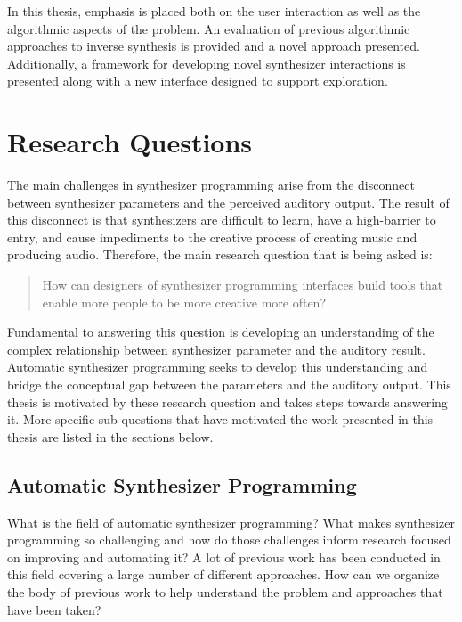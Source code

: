 
In this thesis, emphasis is placed both on the user interaction as well as the algorithmic aspects of the problem. An evaluation of previous algorithmic approaches to inverse synthesis is provided and a novel approach presented. Additionally, a framework for developing novel synthesizer interactions is presented along with a new interface designed to support exploration.

\section{Research Questions}
The main challenges in synthesizer programming arise from the disconnect between synthesizer parameters and the perceived auditory output. The result of this disconnect is that synthesizers are difficult to learn, have a high-barrier to entry, and cause impediments to the creative process of creating music and producing audio. Therefore, the main research question that is being asked is: 

\begin{quote}
	How can designers of synthesizer programming interfaces build tools that enable more people to be more creative more often? 
\end{quote}

 Fundamental to answering this question is developing an understanding of the complex relationship between synthesizer parameter and the auditory result. Automatic synthesizer programming seeks to develop this understanding and bridge the conceptual gap between the parameters and the auditory output. This thesis is motivated by these research question and takes steps towards answering it. More specific sub-questions that have motivated the work presented in this thesis are listed in the sections below.

\subsection{Automatic Synthesizer Programming}
What is the field of automatic synthesizer programming? What makes synthesizer programming so challenging and how do those challenges inform research focused on improving and automating it? A lot of previous work has been conducted in this field covering a large number of different approaches. How can we organize the body of previous work to help understand the problem and approaches that have been taken?

